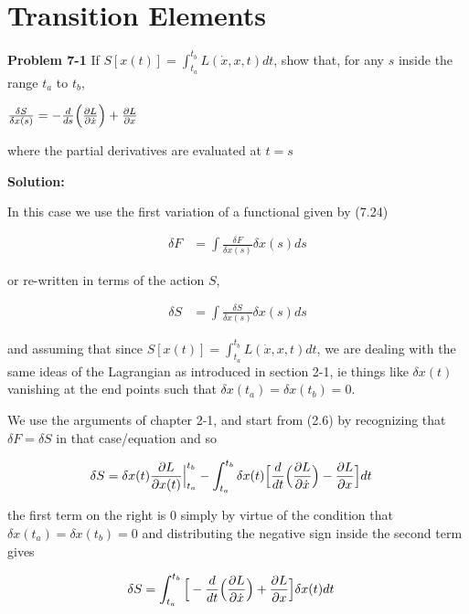 \documentclass{article}
\begin{document}
\section{Transition Elements}

\textbf{Problem 7-1}
If $S[x(t)] = \int_{t_{a}}^{t_{b}} L(\dot{x}, x, t)dt$, show that, for any $s$ inside the range $t_{a}$ to $t_{b}$, 

$\frac{\delta S}{\delta x(s)} = -\frac{d}{ds}\Big( \pdv{L}{\dot{x}} \Big) + \pdv{L}{x} $

where the partial derivatives are evaluated at $t = s$


\textbf{Solution:} 

In this case we use the first variation of a functional given by (7.24) 

\begin{align*}
         \delta F &=\int\frac{\delta F}{\delta x(s)}\delta x(s)ds
\end{align*}

or re-written in terms of the action $S$, 

\begin{align*}
         \delta S &=\int\frac{\delta S}{\delta x(s)}\delta x(s)ds
\end{align*}

and assuming that since $S[x(t)] = \int_{t_{a}}^{t_{b}} L(\dot{x}, x, t)dt$, we are dealing with the same ideas of the Lagrangian as introduced in section 2-1, ie things like $\delta  x(t)$ vanishing at the end points such that $\delta x(t_{a}) = \delta x(t_{b}) = 0$. 

We use the arguments of chapter 2-1, and start from (2.6) by recognizing that $\delta F = \delta S$ in that case/equation and so 

\begin{align*}
         \delta S &=  \delta x(t) \pdv{L}{x(t)} \Big|_{t_{a}}^{t_{b}} - \int_{t_{a}}^{t_{b}}\delta x(t) \Big[ \frac{d}{dt} \Big( \pdv{L}{\dot{x}} \Big) -  \pdv{L}{x} \Big]dt 
\end{align*}

the first term on the right is 0 simply by virtue of the condition that $\delta x(t_{a}) = \delta x(t_{b}) = 0$ and distributing the negative sign inside the second term gives 

\begin{align*}
         \delta S &=  \int_{t_{a}}^{t_{b}} \Big[ -\frac{d}{dt} \Big( \pdv{L}{\dot{x}} \Big) +  \pdv{L}{x} \Big]\delta x(t) dt 
\end{align*}
\end{document}
